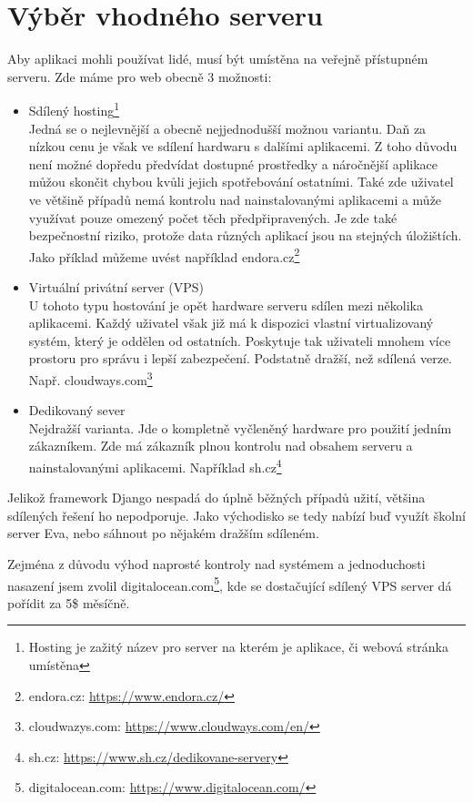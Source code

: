 \section{Výběr vhodného serveru}
Aby aplikaci mohli používat lidé, musí být umístěna na veřejně přístupném serveru. Zde máme pro web obecně 3 možnosti:
\begin{itemize}
    \item Sdílený hosting\footnote{Hosting je zažitý název pro server na kterém je aplikace, či webová stránka umístěna}\\
    Jedná se o nejlevnější a obecně nejjednodušší možnou variantu. Daň za nízkou cenu je však ve sdílení hardwaru s dalšími aplikacemi. Z toho důvodu není možné dopředu předvídat dostupné prostředky a náročnější aplikace můžou skončit chybou kvůli jejich spotřebování ostatními. Také zde uživatel ve většině případů nemá kontrolu nad nainstalovanými aplikacemi a může využívat pouze omezený počet těch předpřipravených. Je zde také bezpečnostní riziko, protože data různých aplikací jsou na stejných úložištích. Jako příklad můžeme uvést například endora.cz\footnote{endora.cz: \url{https://www.endora.cz/}}
    \item Virtuální privátní server (VPS)\\
    U tohoto typu hostování je opět hardware serveru sdílen mezi několika aplikacemi. Každý uživatel však již má k dispozici vlastní virtualizovaný systém, který je oddělen od ostatních. Poskytuje tak uživateli mnohem více prostoru pro správu i lepší zabezpečení. Podstatně dražší, než sdílená verze. Např. cloudways.com\footnote{cloudwazys.com: \url{https://www.cloudways.com/en/}} 
    \item Dedikovaný sever\\
    Nejdražší varianta. Jde o kompletně vyčleněný hardware pro použití jedním zákazníkem. Zde má zákazník plnou kontrolu nad obsahem serveru a nainstalovanými aplikacemi. Například sh.cz\footnote{sh.cz: \url{https://www.sh.cz/dedikovane-servery}}
\end{itemize}

Jelikož framework Django nespadá do úplně běžných případů užití, většina sdílených řešení ho nepodporuje. Jako východisko se tedy nabízí buď využít školní server Eva, nebo sáhnout po nějakém dražším sdíleném.
\par Zejména z důvodu výhod naprosté kontroly nad systémem a jednoduchosti nasazení jsem zvolil digitalocean.com\footnote{digitalocean.com: \url{https://www.digitalocean.com/}}, kde se dostačující sdílený VPS server dá pořídit za 5\$ měsíčně.

